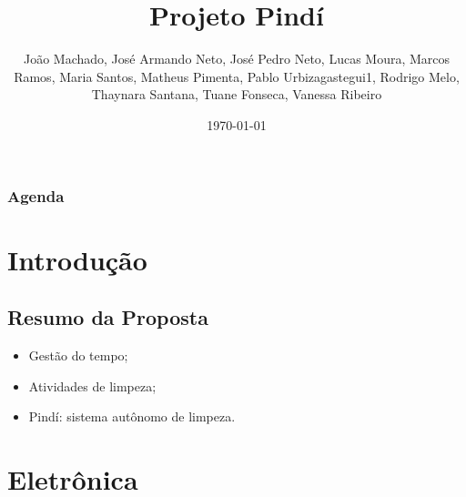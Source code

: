\documentclass{beamer}
\title[Projeto Pindí]{Projeto Pindí} %
\author{João Machado, José Armando Neto, José Pedro Neto, Lucas Moura, 
Marcos Ramos, Maria Santos, Matheus Pimenta, Pablo Urbizagastegui1, Rodrigo Melo, Thaynara Santana, Tuane Fonseca, Vanessa Ribeiro} %
\institute[UnB] %
{
Universidade de Brasília \\ %
\medskip
}
\date{\today} %
\begin{document}
\begin{frame}
\titlepage %
\end{frame}

\begin{frame}
\frametitle{Agenda} %
\tiny \begin{multicols}{2}
  \tableofcontents
\end{multicols}%
\end{frame}



\section{Introdução}
\subsection{Resumo da Proposta}
\begin{frame}
  \begin{itemize}
      \item Gestão do tempo;
      \item Atividades de limpeza;
      \item Pindí: sistema autônomo de limpeza.
  \end{itemize}
\end{frame}

\section{Eletrônica}
\end{document}
